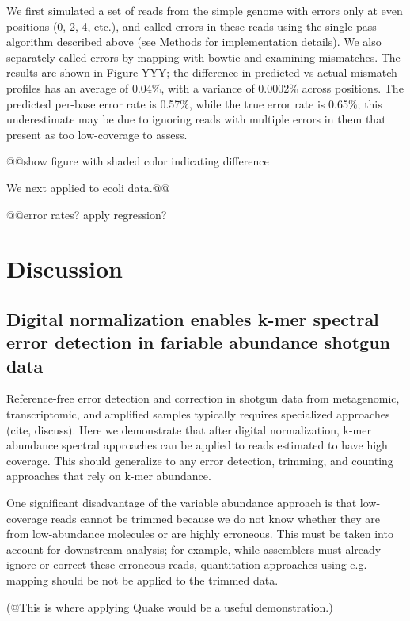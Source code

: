 We first simulated a set of reads from the simple genome with errors
only at even positions (0, 2, 4, etc.), and called errors in these
reads using the single-pass algorithm described above (see Methods for
implementation details).  We also separately called errors by mapping
with bowtie and examining mismatches.  The results are shown in Figure
YYY; the difference in predicted vs actual mismatch profiles has an
average of 0.04\%, with a variance of 0.0002\% across positions.  The
predicted per-base error rate is 0.57\%, while the true error rate is
0.65\%; this underestimate may be due to ignoring reads with multiple
errors in them that present as too low-coverage to assess.

@@show figure with shaded color indicating difference

We next applied to ecoli data.@@

@@error rates? apply regression?

\section{Discussion}

\subsection{Digital normalization enables k-mer spectral error detection in fariable abundance shotgun data}

Reference-free error detection and correction in shotgun data from
metagenomic, transcriptomic, and amplified samples typically requires
specialized approaches (cite, discuss).  Here we demonstrate
that after digital normalization, k-mer abundance spectral approaches
can be applied to reads estimated to have high coverage.  This should
generalize to any error detection, trimming, and counting approaches
that rely on k-mer abundance.

One significant disadvantage of the variable abundance approach is
that low-coverage reads cannot be trimmed because we do not know
whether they are from low-abundance molecules or are highly erroneous.
This must be taken into account for downstream analysis; for example,
while assemblers must already ignore or correct these erroneous reads,
quantitation approaches using e.g. mapping should be not be applied
to the trimmed data.

(@This is where applying Quake would be a useful demonstration.)


